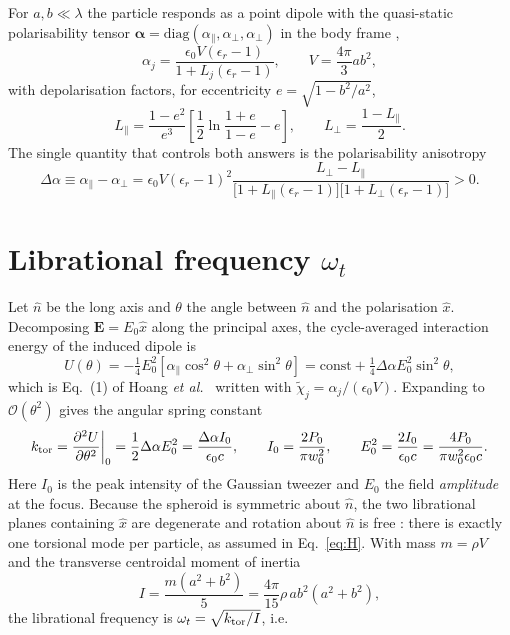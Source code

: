 \documentclass[11pt,a4paper]{article}
\newcommand{\dalpha}{\Delta\alpha}
\begin{document}
For $a,b\ll\lambda$ the particle responds as a point dipole with the
quasi-static polarisability tensor
$\boldsymbol{\alpha}=\mathrm{diag}(\alpha_{\parallel},\alpha_{\perp},\alpha_{\perp})$
in the body frame \cite{Landau,Osborn,BH},
\begin{equation}
  \alpha_j=\frac{\epsilon_0V(\epsilon_r-1)}{1+L_j(\epsilon_r-1)},
  \qquad V=\frac{4\pi}{3}ab^{2},
  \label{eq:alpha}
\end{equation}
with depolarisation factors, for eccentricity $e=\sqrt{1-b^{2}/a^{2}}$,
\begin{equation}
  L_{\parallel}=\frac{1-e^{2}}{e^{3}}
  \left[\frac{1}{2}\ln\!\frac{1+e}{1-e}-e\right],
  \qquad
  L_{\perp}=\frac{1-L_{\parallel}}{2}.
  \label{eq:L}
\end{equation}
The single quantity that controls both answers is the polarisability anisotropy
\begin{equation}
  \dalpha\equiv\alpha_{\parallel}-\alpha_{\perp}
  =\epsilon_0V(\epsilon_r-1)^{2}
   \frac{L_{\perp}-L_{\parallel}}
        {\bigl[1+L_{\parallel}(\epsilon_r-1)\bigr]
         \bigl[1+L_{\perp}(\epsilon_r-1)\bigr]}>0 .
  \label{eq:dalpha}
\end{equation}

\section{Librational frequency $\omega_t$}

Let $\hat n$ be the long axis and $\theta$ the angle between $\hat n$ and the
polarisation $\hat x$.  Decomposing $\mathbf E=E_0\hat x$ along the principal
axes, the cycle-averaged interaction energy of the induced dipole is
\begin{equation}
  U(\theta)=-\tfrac14 E_0^{2}
  \left[\alpha_{\parallel}\cos^{2}\theta+\alpha_{\perp}\sin^{2}\theta\right]
  =\mathrm{const}+\tfrac14\dalpha E_0^{2}\sin^{2}\theta ,
  \label{eq:Utheta}
\end{equation}
which is Eq.~(1) of Hoang \emph{et al.}~\cite{Hoang2016} written with
$\tilde\chi_j=\alpha_j/(\epsilon_0V)$.  Expanding to $\mathcal O(\theta^{2})$
gives the angular spring constant
\begin{equation}
  k_{\rm tor}=\frac{\partial^{2}U}{\partial\theta^{2}}\bigg|_{0}
  =\frac{1}{2}\dalpha E_0^{2}=\frac{\dalpha I_0}{\epsilon_0c},
  \qquad
  I_0=\frac{2P_0}{\pi w_0^{2}},
  \qquad
  E_0^{2}=\frac{2I_0}{\epsilon_0c}=\frac{4P_0}{\pi w_0^{2}\epsilon_0c}.
  \label{eq:ktor}
\end{equation}
Here $I_0$ is the peak intensity of the Gaussian tweezer and $E_0$ the field
\emph{amplitude} at the focus.  Because the spheroid is symmetric about $\hat n$,
the two librational planes containing $\hat x$ are degenerate and rotation about
$\hat n$ is free \cite{Stickler2021}: there is exactly one torsional mode per
particle, as assumed in Eq.~\eqref{eq:H}.  With mass $m=\rho V$ and the transverse centroidal moment of
inertia
\begin{equation}
  I=\frac{m\left(a^{2}+b^{2}\right)}{5}
   =\frac{4\pi}{15}\rho\,ab^{2}\left(a^{2}+b^{2}\right),
  \label{eq:inertia}
\end{equation}
the librational frequency is $\omega_t=\sqrt{k_{\rm tor}/I}$, i.e.
\end{document}
